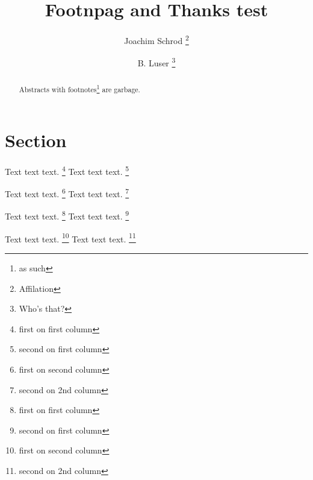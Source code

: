 \documentclass[twocolumn]{article}
\begin{document}
\title{Footnpag and Thanks test}

\author{Joachim Schrod%
    \thanks{Affilation}
    \and
    B. Luser%
    \thanks{Who's that?}
    }

\maketitle


\begin{abstract}
  Abstracts with footnotes\footnote{as such} are garbage.
\end{abstract}



\section{Section}

Text text text.%
\footnote{first on first column}
Text text text.%
\footnote{second on first column}

\newpage

Text text text.%
\footnote{first on second column}
Text text text.%
\footnote{second on 2nd column}


\clearpage


Text text text.%
\footnote{first on first column}
Text text text.%
\footnote{second on first column}

\newpage

Text text text.%
\footnote{first on second column}
Text text text.%
\footnote{second on 2nd column}
\end{document}
